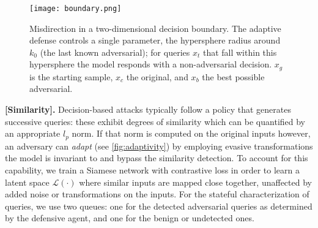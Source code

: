 \begin{figure}
    \centering
    \texttt{[image: boundary.png]}
    \caption[Misdirection in a two-dimensional decision boundary.]{Misdirection in a two-dimensional decision boundary. The adaptive defense controls a single parameter, the hypersphere radius around $k_0$ (the last known adversarial); for queries $x_t$ that fall within this hypersphere the model responds with a non-adversarial decision. $x_g$ is the starting sample, $x_c$ the original, and $x_b$ the best possible adversarial.}
    \label{fig:boundary}
\end{figure}

\textbf{[Similarity].} Decision-based attacks typically follow a policy that generates successive queries: these exhibit degrees of similarity which can be quantified by an appropriate $l_p$ norm.
If that norm is computed on the original inputs however, an adversary can \textit{adapt} (see \autoref{fig:adaptivity}) by employing evasive transformations the model is invariant to and bypass the similarity detection.
To account for this capability, we train a Siamese network with contrastive loss in order to learn a latent space $\mathcal{L}(\cdot)$ where similar inputs are mapped close together, unaffected by added noise or transformations on the inputs.
For the stateful characterization of queries, we use two queues: one for the detected adversarial queries as determined by the defensive agent, and one for the benign or undetected ones.

